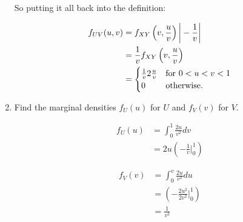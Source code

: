 \documentclass{article}
\newcommand{\1}{\mathbf{1}}
\begin{document}
\begin{enumerate}
    So putting it all back into the definition:
    
    \begin{align*}
     f_{UV}(u,v) &= f_{XY}\left(v, \frac{u}{v}\right) \bigg|- \frac{1}{v}\bigg| \\
     &= \frac{1}{v} f_{XY}\left(v, \frac{u}{v}\right) \\
     &= \begin{cases}
        \frac{1}{v} 2\frac{u}{v} & \hbox{for } 0 < u < v < 1\\ 
        0 & \hbox{otherwise.}
        \end{cases}
    \end{align*}
    
    \item Find the marginal densities $f_U(u)$ for $U$ and  $f_V(v)$ for $V$.
    
    \begin{align*}
    f_{U}(u) &= \int_0^1 \frac{2u}{v^2} dv \\
    &= 2u \left(-\frac{1}{v}\bigg|_0^1\right) 
    \end{align*}
     
    \begin{align*}
    f_{V}(v) &= \int_0^v \frac{2u}{v^2} du \\
    &= \left(-\frac{2u^2}{2v^2}\bigg|_0^1\right) \\
    &= \frac{1}{v^2}
    \end{align*}
     
\end{enumerate}
\end{document}
